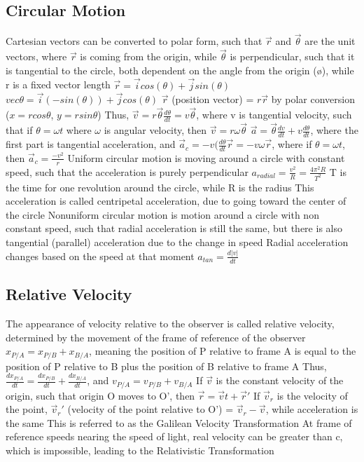 \documentclass[11 pt, twoside]{article}
\newenvironment{outline*}
{
	\begin{outline}[enumerate]
	}
	{\end{outline}
}
\begin{document}
\subsection{Circular Motion}
\begin{outline*}
\1 Cartesian vectors can be converted to polar form, such that $\vec{r}$ and $\vec{\theta}$ are the unit vectors, where $\vec{r}$ is coming from the origin, while $\vec{\theta}$ is perpendicular, such that it is tangential to the circle, both dependent on the angle from the origin (ø), while r is a fixed vector length
\2 $\vec{r} = \vec{i}cos(\theta) + \vec{j}sin(\theta)$
\2 $vec{\theta} = \vec{i}(-sin(\theta)) + \vec{j}cos(\theta)$
\2 $\vec{r}$ (position vector) = $r\vec{r}$ by polar conversion ($x = rcos\theta$, $y = rsin\theta$)
\2 Thus, $\vec{v} = r\vec{\theta}\frac{d\theta}{dt} = v\vec{\theta}$, where v is tangential velocity, such that if $\theta = \omega t$ where $\omega$ is angular velocity, then $\vec{v} = r\omega\vec{\theta}$
\2 $\vec{a} = \vec{\theta}\frac{dv}{dt} + v\frac{d\theta}{dt}$, where the first part is tangential acceleration, and $\vec{a}_c = -v(\frac{d\theta}{dt}\vec{r} = -v\omega\vec{r}$, where if $\theta = \omega t$, then $\vec{a}_c = \frac{-v^2}{r}$
\1 Uniform circular motion is moving around a circle with constant speed, such that the acceleration is purely perpendicular
\1 $a_{radial} = \frac{v^2}{R} = \frac{4\pi^2R}{T^2}$
\2 T is the time for one revolution around the circle, while R is the radius
\2 This acceleration is called centripetal acceleration, due to going toward the center of the circle
\1 Nonuniform circular motion is motion around a circle with non constant speed, such that radial acceleration is still the same, but there is also tangential (parallel) acceleration due to the change in speed
\2 Radial acceleration changes based on the speed at that moment
\2 $a_{tan} = \frac{d|v|}{dt}$
\end{outline*}
\subsection{Relative Velocity}
\begin{outline*}
\1 The appearance of velocity relative to the observer is called relative velocity, determined by the movement of the frame of reference of the observer
\2 $x_{P/A} = x_{P/B} + x_{B/A}$, meaning the position of P relative to frame A is equal to the position of P relative to B plus the position of B relative to frame A
\2 Thus, $\frac{dx_{P/A}}{dt} = \frac{dx_{P/B}}{dt} + \frac{dx_{B/A}}{dt}$, and $v_{P/A} = v_{P/B} + v_{B/A}$
\1 If  $\vec{v}$ is the constant velocity of the origin, such that origin O moves to O’, then $\vec{r} = \vec{v}t + \vec{r}'$ 
\2 If $\vec{v}_r$ is the velocity of the point, $\vec{v}_r'$ (velocity of the point relative to O’) = $\vec{v}_r - \vec{v}$, while acceleration is the same
\1 This is referred to as the Galilean Velocity Transformation
\2 At frame of reference speeds nearing the speed of light, real velocity can be greater than c, which is impossible, leading to the Relativistic Transformation
\end{outline*}
\end{document}
